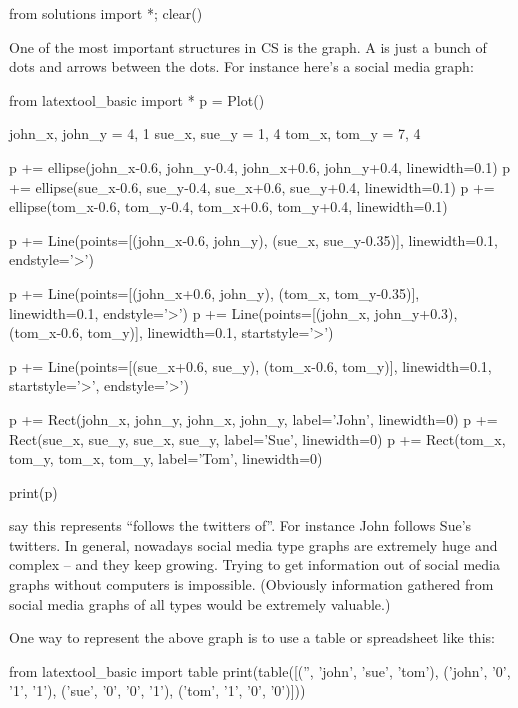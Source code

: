 \begin{python0}
from solutions import *; clear()
\end{python0}

One of the most important structures in CS is the graph. A  is just a bunch of dots and arrows between the dots. For instance here's a social media graph:

\begin{python}
from latextool_basic import *
p = Plot()

john_x, john_y = 4, 1
sue_x, sue_y = 1, 4
tom_x, tom_y = 7, 4

p += ellipse(john_x-0.6, john_y-0.4, john_x+0.6, john_y+0.4, linewidth=0.1)
p += ellipse(sue_x-0.6, sue_y-0.4, sue_x+0.6, sue_y+0.4, linewidth=0.1)
p += ellipse(tom_x-0.6, tom_y-0.4, tom_x+0.6, tom_y+0.4, linewidth=0.1)

p += Line(points=[(john_x-0.6, john_y), (sue_x, sue_y-0.35)], linewidth=0.1, endstyle='>')

p += Line(points=[(john_x+0.6, john_y), (tom_x, tom_y-0.35)], linewidth=0.1, endstyle='>')
p += Line(points=[(john_x, john_y+0.3), (tom_x-0.6, tom_y)], linewidth=0.1, startstyle='>')

p += Line(points=[(sue_x+0.6, sue_y), (tom_x-0.6, tom_y)], linewidth=0.1, startstyle='>', endstyle='>')

p += Rect(john_x, john_y, john_x, john_y, label='John', linewidth=0)
p += Rect(sue_x, sue_y, sue_x, sue_y, label='Sue', linewidth=0)
p += Rect(tom_x, tom_y, tom_x, tom_y, label='Tom', linewidth=0)

print(p)
\end{python}

say this represents ``follows the twitters of''. For instance John follows Sue's twitters. In general, nowadays social media type graphs are extremely huge and complex -- and they keep growing. Trying to get information out of social media graphs without computers is impossible. (Obviously information gathered from social media graphs of all types would be extremely valuable.)

One way to represent the above graph is to use a table or spreadsheet like this:

\begin{python}
from latextool_basic import table
print(table([('', 'john', 'sue', 'tom'), ('john', '0', '1', '1'), ('sue', '0', '0', '1'), ('tom', '1', '0', '0')]))
\end{python}

